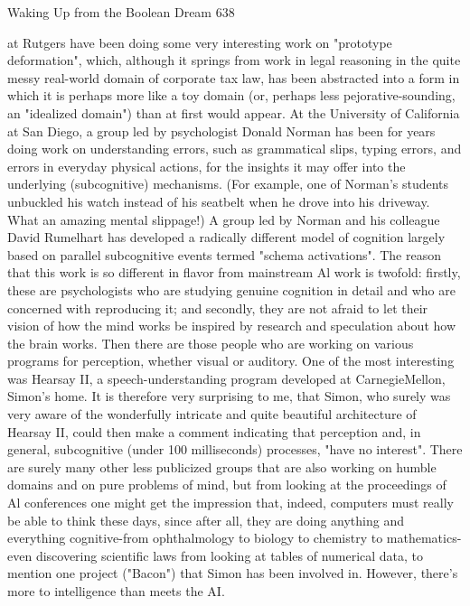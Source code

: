 Waking Up from the Boolean Dream                                                      638

at Rutgers have been doing some very interesting work on "prototype deformation",
which, although it springs from work in legal reasoning in the quite messy real-world
domain of corporate tax law, has been abstracted into a form in which it is perhaps
more like a toy domain (or, perhaps less pejorative-sounding, an "idealized domain")
than at first would appear.
        At the University of California at San Diego, a group led by psychologist
Donald Norman has been for years doing work on understanding errors, such as
grammatical slips, typing errors, and errors in everyday physical actions, for the
insights it may offer into the underlying (subcognitive) mechanisms. (For example,
one of Norman's students unbuckled his watch instead of his seatbelt when he drove
into his driveway. What an amazing mental slippage!) A group led by Norman and his
colleague David Rumelhart has developed a radically different model of cognition
largely based on parallel subcognitive events termed "schema activations". The reason
that this work is so different in flavor from mainstream Al work is twofold: firstly,
these are psychologists who are studying genuine cognition in detail and who are
concerned with reproducing it; and secondly, they are not afraid to let their vision of
how the mind works be inspired by research and speculation about how the brain
works.
        Then there are those people who are working on various programs for
perception, whether visual or auditory. One of the most interesting was Hearsay II, a
speech-understanding program developed at CarnegieMellon, Simon's home. It is
therefore very surprising to me, that Simon, who surely was very aware of the
wonderfully intricate and quite beautiful architecture of Hearsay II, could then make a
comment indicating that perception and, in general, subcognitive (under 100
milliseconds) processes, "have no interest".
        There are surely many other less publicized groups that are also working on
humble domains and on pure problems of mind, but from looking at the proceedings
of Al conferences one might get the impression that, indeed, computers must really be
able to think these days, since after all, they are doing anything and everything
cognitive-from ophthalmology to biology to chemistry to mathematics-even
discovering scientific laws from looking at tables of numerical data, to mention one
project ("Bacon") that Simon has been involved in. However, there's more to
intelligence than meets the AI.


